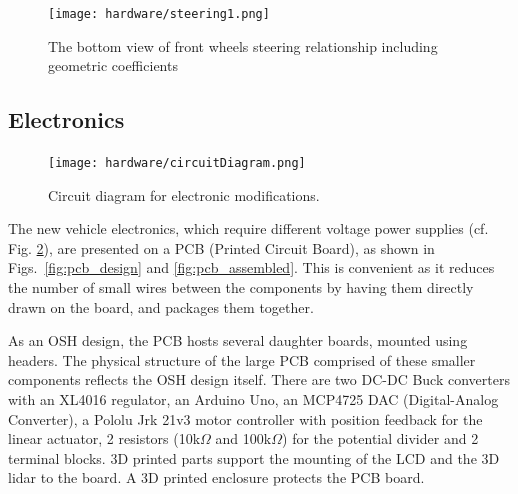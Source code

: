 \documentclass[a4paper]{article}
\begin{document}
	
	\begin{figure}[h]
		\texttt{[image: hardware/steering1.png]}
		\caption{The bottom view of front wheels steering relationship including geometric coefficients}
		\label{fig:steering}
	\end{figure}
	
	
	\subsection{Electronics}
	
	\begin{figure}[h]
		\texttt{[image: hardware/circuitDiagram.png]}
		\caption{Circuit diagram for electronic modifications.}
		\label{fig:circuitDiagram}
	\end{figure}
	
	
	The new vehicle electronics, which require different voltage power supplies (cf. Fig. \ref{fig:circuitDiagram}), are presented on a PCB (Printed Circuit Board), as shown in Figs.~\ref{fig:pcb_design} and \ref{fig:pcb_assembled}. This is convenient as it reduces the number of small wires between the components by having them directly drawn on the board, and packages them together.
	
	As an OSH design, the PCB hosts several daughter boards, mounted using headers. The physical structure of the large PCB comprised of these smaller components reflects the OSH design itself. There are two DC-DC Buck converters with an XL4016 regulator, an Arduino Uno, an MCP4725 DAC (Digital-Analog Converter), a Pololu Jrk 21v3 motor controller with position feedback for the linear actuator, 2 resistors (10k$\Omega$ and 100k$\Omega$) for the potential divider and 2 terminal blocks. 3D printed parts support the mounting of the LCD and the 3D lidar to the board. A 3D printed enclosure protects the PCB board.
	
\end{document}
